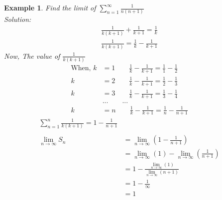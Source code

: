 \documentclass{article}
\newtheorem{example}{Example}[section]
\newcommand{\ds}{\displaystyle}
\begin{document}
\begin{example}
    Find the limit of $\ds\sum_{n=1}^{\infty}\frac{1}{n(n+1)}$\\
    \textit{Solution:}\\
    \begin{align*}
        \frac{1}{k(k+1)}+\frac{1}{k+1}=\frac{1}{k}\\
        \frac{1}{k(k+1)}=\frac{1}{k}-\frac{1}{k+1}
    \end{align*}
    Now, The value of $\ds \frac{1}{k(k+1)}$ \\
    \begin{align*}
        \text{When, } k&=1\qquad \frac{1}{k}-\frac{1}{k+1}=\frac{1}{1}-\frac{1}{2}\\
        k&=2\qquad \frac{1}{k}-\frac{1}{k+1}=\frac{1}{2}-\frac{1}{3}\\
        k&=3\qquad \frac{1}{k}-\frac{1}{k+1}=\frac{1}{3}-\frac{1}{4}\\
        & ...\qquad ...\\
        k&=n\qquad \frac{1}{k}-\frac{1}{k+1}=\frac{1}{n}-\frac{1}{n+1}
    \end{align*}
    \begin{align*}
        \sum_{n=1}^{n} \frac{1}{k(k+1)}=1-\frac{1}{n+1}\\\\
        \lim_{n\to\infty} S_n &= \lim_{n\to\infty}(1-\frac{1}{n+1})\\
        &= \lim_{n\to\infty}(1)-\lim_{n\to\infty}(\frac{1}{n+1})\\
        &= 1-\frac{\lim_{n\to\infty}(1)}{\lim_{n\to\infty}(n+1)}\\
        &= 1-\frac{1}{\infty}\\
        &= 1
    \end{align*}

\end{example}
\end{document}
